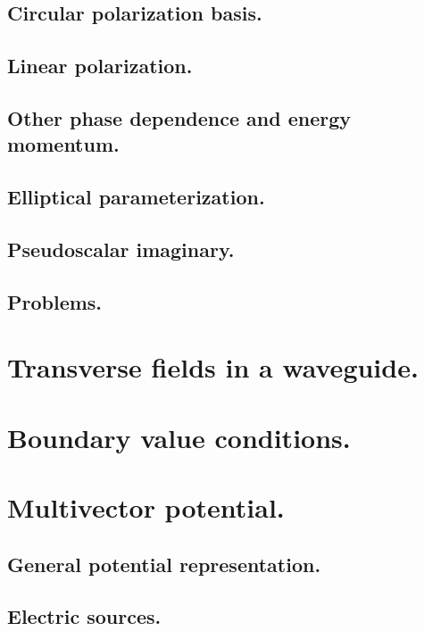          \subsection{Circular polarization basis.}
            
         \subsection{Linear polarization.}
            
         \subsection{Other phase dependence and energy momentum.}
            
         \subsection{Elliptical parameterization.}
            
         \subsection{Pseudoscalar imaginary.}
            
         \subsection{Problems.}
            
      \section{Transverse fields in a waveguide.}
         
      \section{Boundary value conditions.}
         
      \section{Multivector potential.}
         \subsection{General potential representation.}
            
         \subsection{Electric sources.}
            
